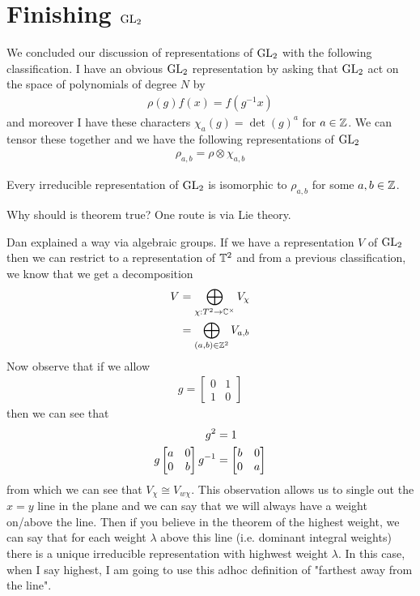 \documentclass[12pt]{article}
\begin{document}
\section{Finishing $\operatorname{GL}_2$}
We concluded our discussion of representations of $\operatorname{GL}_2$ with the following classification. I have an obvious $\operatorname{GL}_2$ representation by 
asking that $\operatorname{GL}_2$ act on the space of polynomials of degree $N$ by \begin{align*}
    \rho(g)f(x) = f(g^{-1}x)
\end{align*}
and moreover I have these characters $\chi_a(g) = \det(g)^a$ for $a\in\mathbb{Z}$. We can tensor these together
and we have the following representations of $\operatorname{GL}_2$ \begin{align*}
    \rho_{a,b} = \rho\otimes \chi_{a,b}
\end{align*}

\begin{theorem}
    Every irreducible representation of $\operatorname{GL}_2$ is isomorphic to $\rho_{a,b}$ for some $a,b\in\mathbb{Z}$.
\end{theorem}

Why should is theorem true? One route is via Lie theory. 

Dan explained a way via algebraic groups. If we have a representation $V$ of $\operatorname{GL}_2$ then we can 
restrict to a representation of $\mathbb{T}^2$ and from a previous classification, we know that we get a decomposition \begin{align*}
    V &= \bigoplus_{\chi:T^2\to \mathbb{C}^\times}V_\chi \\
    &= \bigoplus_{(a,b)\in\mathbb{Z}^2}V_{a,b}
\end{align*}
Now observe that if we allow \begin{align*}
    g = \begin{bmatrix}
        0 & 1 \\
        1 & 0
    \end{bmatrix} 
\end{align*}then we can see that \begin{align*}
    g^2 &= 1 \\
    g\begin{bmatrix}
        a & 0\\
        0 & b
    \end{bmatrix}{g}^{-1} &= \begin{bmatrix}
        b & 0\\
        0 & a
    \end{bmatrix}\\
\end{align*} from which we can see that $V_\chi \cong V_{w\chi}$. This observation allows us to single
out the $x= y$ line in the plane and we can say that we will always have a weight on/above the line. Then 
if you believe in the theorem of the highest weight, we can say that for each weight $\lambda$ above this line 
(i.e. dominant integral weights) there is a unique irreducible representation with highwest weight $\lambda$.
In this case, when I say highest, I am going to use this adhoc definition of "farthest away from the line".
\end{document}
